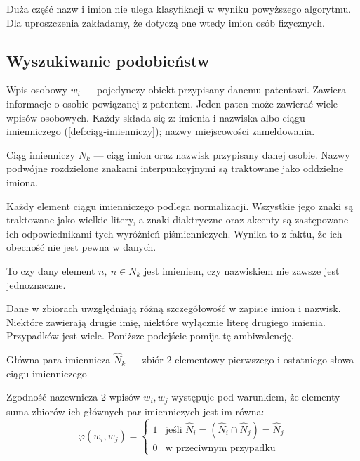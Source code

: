 \begin{uwaga}
Duża część nazw i imion nie ulega klasyfikacji w wyniku powyższego
algorytmu. Dla uproszczenia zakładamy, że dotyczą one wtedy imion
osób fizycznych.
\end{uwaga}



\subsection{Wyszukiwanie podobieństw}

\begin{defi}
Wpis osobowy $w_i$ --- pojedynczy obiekt przypisany danemu patentowi. Zawiera
informacje o osobie powiązanej z patentem. Jeden paten może zawierać
wiele wpisów osobowych. Każdy składa się z: imienia i nazwiska albo
ciągu imienniczego (\cref{def:ciąg-imienniczy}); nazwy miejscowości zameldowania.
\end{defi}

\begin{defi}\label{def:ciąg-imienniczy}
Ciąg imienniczy $N_k$ --- ciąg imion oraz nazwisk przypisany danej osobie.
Nazwy podwójne rozdzielone znakami interpunkcyjnymi są traktowane jako
oddzielne imiona.
\end{defi}

Każdy element ciągu imienniczego podlega normalizacji. Wszystkie jego 
znaki są traktowane jako wielkie litery, a znaki diaktryczne oraz akcenty 
są zastępowane ich odpowiednikami tych wyróżnień piśmienniczych.
Wynika to z faktu, że ich obecność nie jest pewna w danych.

\begin{uwaga}
To czy dany element $n,\ n\in N_k$ jest imieniem, czy nazwiskiem nie zawsze
jest jednoznaczne.
\end{uwaga}

\begin{uwaga}
Dane w zbiorach uwzględniają różną szczegółowość w zapisie imion i nazwisk.
Niektóre zawierają drugie imię, niektóre wyłącznie literę drugiego imienia.
Przypadków jest wiele. Poniższe podejście pomija tę ambiwalencję.
\end{uwaga}

\begin{defi}
Główna para imiennicza $\hat N_k$ --- zbiór 2-elementowy pierwszego 
i ostatniego słowa ciągu imienniczego
\end{defi}

\begin{defi}\label{defi:zgodność-nazw}
Zgodność nazewnicza 2 wpisów $w_i,w_j$ występuje pod warunkiem, że
elementy suma zbiorów ich głównych par imienniczych jest im równa:
$$
\varphi(w_i, w_j) = \begin{cases}
  1 & \text{jeśli } \hat N_i = (\hat N_i \cap \hat N_j) = \hat N_j\\
  0 & \text{w przeciwnym przypadku}
\end{cases}
$$
\end{defi}

